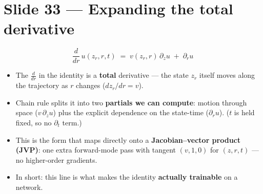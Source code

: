 \documentclass[11pt]{article}
\begin{document}
\section*{Slide 33 --- Expanding the total derivative}
\begin{equation*}
  \frac{d}{dr}\, u(z_r, r, t) \;=\; v(z_r, r)\, \partial_z u \;+\; \partial_r u
\end{equation*}
\begin{itemize}
  \item The $\frac{d}{dr}$ in the identity is a \textbf{total} derivative ---
        the state $z_r$ itself moves along the trajectory as $r$ changes
        ($dz_r / dr = v$).
  \item Chain rule splits it into two \textbf{partials we can compute}:
        motion through space ($v\, \partial_z u$) plus the explicit dependence
        on the state-time ($\partial_r u$). ($t$ is held fixed, so no
        $\partial_t$ term.)
  \item This is the form that maps directly onto a \textbf{Jacobian--vector
        product (JVP)}: one extra forward-mode pass with tangent $(v, 1, 0)$
        for $(z, r, t)$ --- no higher-order gradients.
  \item In short: this line is what makes the identity \textbf{actually
        trainable} on a network.
\end{itemize}

\end{document}
